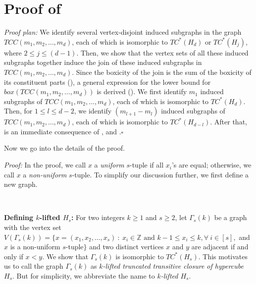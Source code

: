 \documentclass[twoside, 11pt]{article}
\newcommand{\M}{TCC(m_1,m_2,\dots,m_d)}
\newcommand{\TTCH}[1]{TC^*(H_ {#1})}
\newcommand{\Z}{\mathbb{Z}}
\begin{document}
\section{Proof of }


\textit{Proof plan:} We identify several vertex-disjoint induced subgraphs in the graph $\M$, each of which is isomorphic to $\TTCH{d}$ or $\TTCH{j}$, where $2 \leq j \leq (d-1)$. Then, we show that the vertex sets of all these induced subgraphs together induce the join of these induced subgraphs in $\M$. Since the boxicity of the join is the sum of the boxicity of its constituent parts (), a general expression for the lower bound for $box(\M)$ is derived (). We first identify $m_1$ induced subgraphs of $\M$, each of which is isomorphic to $\TTCH{d}$. Then, for $1\leq l \leq d-2$, we identify $(m_{l+1}-m_{l})$ induced subgraphs of $\M$, each of which is isomorphic to $\TTCH{d-l}$. After that,  is an immediate consequence of %
,  and .\hfill $\square$

\vspace{0.4cm}

Now we go into the details of the proof.

\vspace{0.4cm}

\noindent \textit{Proof:} In the proof, we call $x$ a \textit{uniform} $s$-tuple if all $x_i$'s are equal; otherwise, we call $x$ a \textit{non-uniform} $s$-tuple. To simplify our discussion further, we first define a new graph.

~~~

\noindent\textbf{Defining $k$-lifted $H_s$: }For two integers $k\geq 1$ and $s\geq 2$, let $\Gamma_s(k)$ be a graph with the vertex set $V(\Gamma_s(k))=\{x=(x_1,x_2,\dots,x_s) \ : \ x_i \in \Z \text{ and } k-1 \leq x_i \leq k, \forall \ i \in [s], $ and $x$ is a non-uniform $s$-tuple$\}$ and two distinct vertices $x$ and $y$ are adjacent if and only if $x < y$. We show that $\Gamma_s(k)$ is isomorphic to $\TTCH{s}$. This motivates us to call the graph $\Gamma_s(k)$ as \textit{$k$-lifted truncated transitive closure of hypercube $H_s$}. But for simplicity, we abbreviate the name to  
\textit{$k$-lifted $H_s$}.
\end{document}
